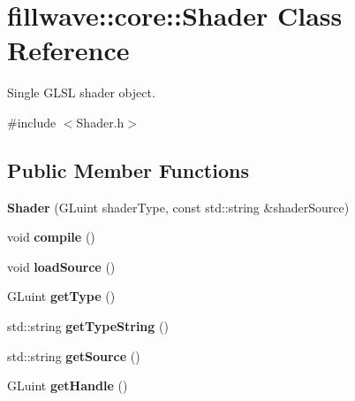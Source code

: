 \hypertarget{classfillwave_1_1core_1_1Shader}{}\section{fillwave\+:\+:core\+:\+:Shader Class Reference}
\label{classfillwave_1_1core_1_1Shader}


Single G\+L\+S\+L shader object.  




{\ttfamily \#include $<$Shader.\+h$>$}

\subsection*{Public Member Functions}
\begin{DoxyCompactItemize}
\item 
\hypertarget{classfillwave_1_1core_1_1Shader_ae7bd676a836a4b226b952d4ebbe28cd5}{}{\bfseries Shader} (G\+Luint shader\+Type, const std\+::string \&shader\+Source)\label{classfillwave_1_1core_1_1Shader_ae7bd676a836a4b226b952d4ebbe28cd5}

\item 
\hypertarget{classfillwave_1_1core_1_1Shader_afa82df26c1bcde242a532edb4a66aabf}{}void {\bfseries compile} ()\label{classfillwave_1_1core_1_1Shader_afa82df26c1bcde242a532edb4a66aabf}

\item 
\hypertarget{classfillwave_1_1core_1_1Shader_a38a2ee21b1c015aa53100366c6787736}{}void {\bfseries load\+Source} ()\label{classfillwave_1_1core_1_1Shader_a38a2ee21b1c015aa53100366c6787736}

\item 
\hypertarget{classfillwave_1_1core_1_1Shader_a59af8ef0743556815d050d31428f5fbf}{}G\+Luint {\bfseries get\+Type} ()\label{classfillwave_1_1core_1_1Shader_a59af8ef0743556815d050d31428f5fbf}

\item 
\hypertarget{classfillwave_1_1core_1_1Shader_a6b3bdb83150af44368bc8ba1161281c2}{}std\+::string {\bfseries get\+Type\+String} ()\label{classfillwave_1_1core_1_1Shader_a6b3bdb83150af44368bc8ba1161281c2}

\item 
\hypertarget{classfillwave_1_1core_1_1Shader_aef97bc241e23dc3fa674efe29cca1161}{}std\+::string {\bfseries get\+Source} ()\label{classfillwave_1_1core_1_1Shader_aef97bc241e23dc3fa674efe29cca1161}

\item 
\hypertarget{classfillwave_1_1core_1_1Shader_a916c77c7fe294ca6cc3541b02d593ac8}{}G\+Luint {\bfseries get\+Handle} ()\label{classfillwave_1_1core_1_1Shader_a916c77c7fe294ca6cc3541b02d593ac8}


\end{DoxyCompactItemize}
